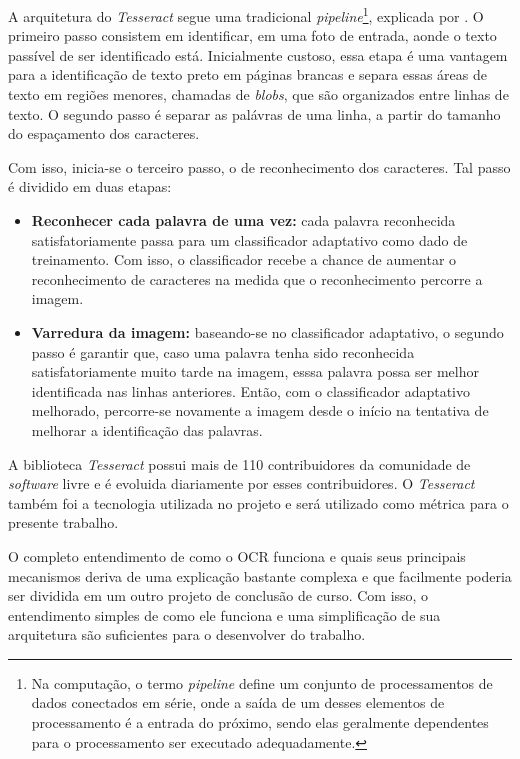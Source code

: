 A arquitetura do \textit{Tesseract} segue uma tradicional \textit{pipeline}\footnote{
  Na computação, o termo \textit{pipeline} define um conjunto de processamentos de dados conectados em série, onde a saída de um desses elementos de processamento é a entrada do próximo, sendo elas geralmente dependentes para o processamento ser executado adequadamente.
}, explicada por . O primeiro passo consistem em identificar, em uma foto de entrada, aonde o texto passível de ser identificado está. Inicialmente custoso, essa etapa é uma vantagem para a identificação de texto preto em páginas brancas e separa essas áreas de texto em regiões menores, chamadas de \textit{blobs}, que são organizados entre linhas de texto. O segundo passo é separar as palávras de uma linha, a partir do tamanho do espaçamento dos caracteres.

Com isso, inicia-se o terceiro passo, o de reconhecimento dos caracteres. Tal passo é dividido em duas etapas:

\begin{itemize}
  \item \textbf{Reconhecer cada palavra de uma vez:} cada palavra reconhecida satisfatoriamente passa para um classificador adaptativo como dado de treinamento. Com isso, o classificador recebe a chance de aumentar o reconhecimento de caracteres na medida que o reconhecimento percorre a imagem.
  \item \textbf{Varredura da imagem:} baseando-se no classificador adaptativo, o segundo passo é garantir que, caso uma palavra tenha sido reconhecida satisfatoriamente muito tarde na imagem, esssa palavra possa ser melhor identificada nas linhas anteriores. Então, com o classificador adaptativo melhorado, percorre-se novamente a imagem desde o início na tentativa de melhorar a identificação das palavras. 
\end{itemize}

A biblioteca \textit{Tesseract} possui mais de 110 contribuidores da comunidade de \textit{software} livre e é evoluida diariamente por esses contribuidores. O \textit{Tesseract} também foi a tecnologia utilizada no projeto  e será utilizado como métrica para o presente trabalho.

\ornament

O completo entendimento de como o OCR funciona e quais seus principais mecanismos deriva de uma explicação bastante complexa e que facilmente poderia ser dividida em um outro projeto de conclusão de curso. Com isso, o entendimento simples de como ele funciona e uma simplificação de sua arquitetura são suficientes para o desenvolver do trabalho.